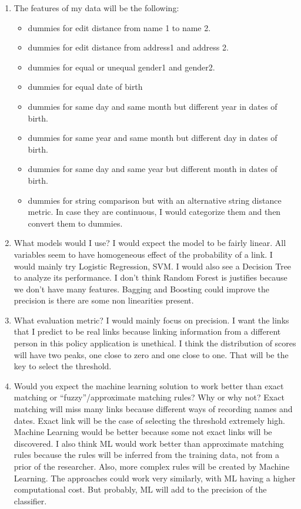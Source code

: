 \documentclass[a4paper, 11pt]{article}
\begin{document}
\begin{enumerate}
\item The features of my data will be the following:
\begin{itemize}
\item dummies for edit distance from name 1 to name 2.
\item dummies for edit distance from address1 and address 2.
\item dummies for equal or unequal gender1 and gender2.
\item dummies for equal date of birth
\item dummies for same day and same month but different year in dates of birth.
\item dummies for same year and same month but different day in dates of birth.
\item dummies for same day and same year but different month in dates of birth.
\item dummies for string comparison but with an alternative string distance metric. In case they are continuous, I would categorize them and then convert them to dummies.
\end{itemize}
\item What models would I use?
I would expect the model to be fairly linear. All variables seem to have homogeneous effect of the probability of a link. I would mainly try Logistic Regression, SVM. I would also see a Decision Tree to analyze its performance. I don't think Random Forest is justifies because we don't have many features. Bagging and Boosting could improve the precision is there are some non linearities present.

\item What evaluation metric?
I would mainly focus on precision. I want the links that I predict to be real links because linking information from a different person in this policy application is unethical. I think the distribution of scores will have two peaks, one close to zero and one close to one. That will be the key to select the threshold. 

\item Would you expect the machine learning solution to work better than exact
matching or “fuzzy”/approximate matching rules? Why or why not?
Exact matching will miss many links because different ways of recording names and dates. Exact link will be the case of selecting the threshold extremely high. Machine Learning would be better because some not exact links will be discovered. I also think ML would work better than approximate matching rules because the rules will be inferred from the training data, not from a prior of the researcher. Also, more complex rules will be created by Machine Learning. The approaches could work very similarly, with ML having a higher computational cost. But probably, ML will add to the precision of the classifier.
\end{enumerate}
\end{document}
